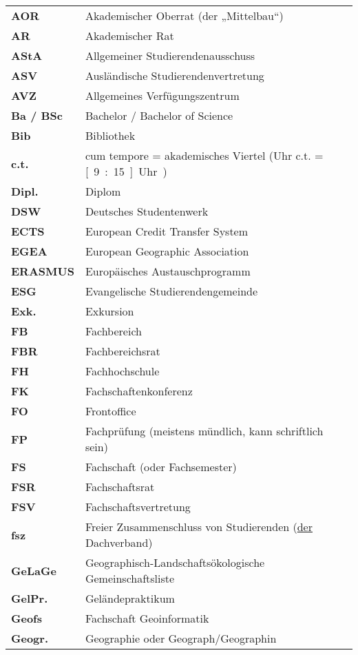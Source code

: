 \begin{longtable}{p{} p{}}
  \textbf{AOR} & Akademischer Oberrat (der „Mittelbau“)\\
  \textbf{AR} & Akademischer Rat\\
  \textbf{AStA} & Allgemeiner Studierendenausschuss\\
  \textbf{ASV} & Ausländische Studierendenvertretung\\
  \textbf{AVZ} & Allgemeines Verfügungszentrum\\
  \textbf{Ba / BSc} & Bachelor / Bachelor of Science\\
  \textbf{Bib} & Bibliothek\\
  \textbf{c.t.} & cum tempore = akademisches Viertel (\unit[9]{Uhr} c.t. = \unit[9:15]{Uhr})\\
  \textbf{Dipl.} & Diplom\\
  \textbf{DSW} & Deutsches Studentenwerk\\
  \textbf{ECTS} & European Credit Transfer System\\
  \textbf{EGEA} & European Geographic Association\\
  \textbf{ERASMUS} & Europäisches Austauschprogramm\\
  \textbf{ESG} & Evangelische Studierendengemeinde\\
  \textbf{Exk.} & Exkursion\\
  \textbf{FB} & Fachbereich\\
  \textbf{FBR} & Fachbereichsrat\\
  \textbf{FH} & Fachhochschule\\
  \textbf{FK} & Fachschaftenkonferenz\\
  \textbf{FO} & Frontoffice\\
  \textbf{FP} & Fachprüfung (meistens mündlich, kann schriftlich sein)\\
  \textbf{FS} & Fachschaft \tiny{(oder Fachsemester)}\\ 
  \textbf{FSR} & Fachschaftsrat\\
  \textbf{FSV} & Fachschaftsvertretung\\
  \textbf{fsz} & Freier Zusammenschluss von Studierenden (\underline{der} Dachverband)\\       
  \textbf{GeLaGe} & Geographisch-Landschaftsökologische Gemeinschaftsliste\\ 
  \textbf{GelPr.} & Geländepraktikum\\
  \textbf{Geofs} & Fachschaft Geoinformatik\\
  \textbf{Geogr.} & Geographie oder Geograph/Geographin\\

\end{longtable}
